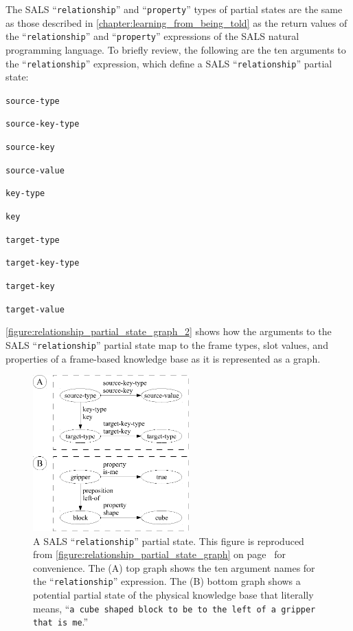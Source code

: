 The SALS ``{\tt{relationship}}'' and ``{\tt{property}}'' types of
partial states are the same as those described in
{\mbox{\autoref{chapter:learning_from_being_told}}} as the return
values of the ``{\tt{relationship}}'' and ``{\tt{property}}''
expressions of the SALS natural programming language.  To briefly
review, the following are the ten arguments to the
``{\tt{relationship}}'' expression, which define a SALS
``{\tt{relationship}}'' partial state:
\begin{packed_enumerate}
\item{{\tt{source-type}}}
\item{{\tt{source-key-type}}}
\item{{\tt{source-key}}}
\item{{\tt{source-value}}}
\item{{\tt{key-type}}}
\item{{\tt{key}}}
\item{{\tt{target-type}}}
\item{{\tt{target-key-type}}}
\item{{\tt{target-key}}}
\item{{\tt{target-value}}}
\end{packed_enumerate}
{\mbox{\autoref{figure:relationship_partial_state_graph_2}}} shows how
the arguments to the SALS ``{\tt{relationship}}'' partial state map to
the frame types, slot values, and properties of a frame-based
knowledge base as it is represented as a graph.
\begin{figure}
\centering
\includegraphics[width=6cm]{gfx/relationship_partial_state_graph-handdrawn}
\caption[A SALS ``{\tt{relationship}}'' partial state.  (Reproduced
  from {\mbox{\autoref{figure:relationship_partial_state_graph}}})]{A
  SALS ``{\tt{relationship}}'' partial state.  This figure is
  reproduced from
  {\mbox{\autoref{figure:relationship_partial_state_graph}}} on
  {\mbox{page~\pageref{figure:relationship_partial_state_graph}}} for
  convenience.  The (A) top graph shows the ten argument names for the
  ``{\tt{relationship}}'' expression.  The (B) bottom graph shows a
  potential partial state of the physical knowledge base that
  literally means, ``{\tt{a cube shaped block to be to the left of a
      gripper that is me}}.''}
\label{figure:relationship_partial_state_graph_2}
\end{figure}
